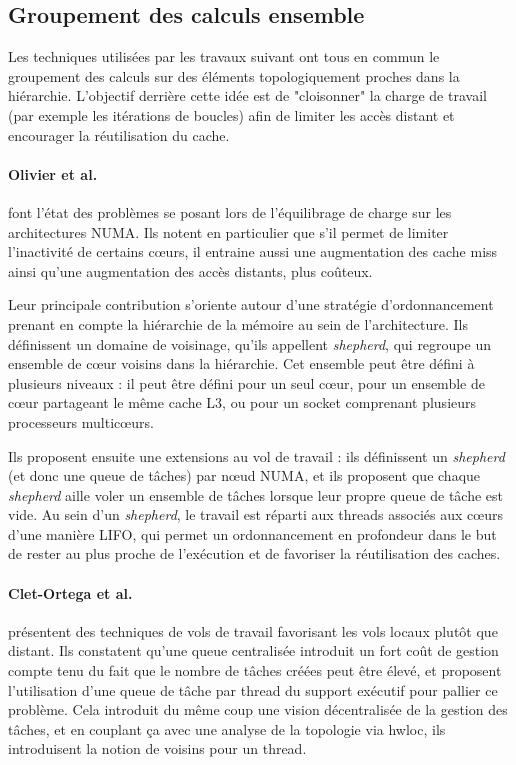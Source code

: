 \subsection{Groupement des calculs ensemble}

Les techniques utilisées par les travaux suivant ont tous en commun le groupement des calculs sur des éléments topologiquement proches dans la hiérarchie.
L'objectif derrière cette idée est de "cloisonner" la charge de travail (par exemple les itérations de boucles) afin de limiter les accès distant et encourager la réutilisation du cache.

\paragraph{Olivier et al.~\cite{Olivier2012, Olivier2013}} font l'état des problèmes se posant lors de l'équilibrage de charge sur les architectures NUMA.
Ils notent en particulier que s'il permet de limiter l'inactivité de certains cœurs, il entraine aussi une augmentation des cache miss ainsi qu'une augmentation des accès distants, plus coûteux.

Leur principale contribution s'oriente autour d'une stratégie d'ordonnancement prenant en compte la hiérarchie de la mémoire au sein de l'architecture.
Ils définissent un domaine de voisinage, qu'ils appellent \emph{shepherd}, qui regroupe un ensemble de cœur voisins dans la hiérarchie.
Cet ensemble peut être défini à plusieurs niveaux : il peut être défini pour un seul cœur, pour un ensemble de cœur partageant le même cache L3, ou pour un socket comprenant plusieurs processeurs multicœurs.

Ils proposent ensuite une extensions au vol de travail : ils définissent un \emph{shepherd} (et donc une queue de tâches) par nœud NUMA, et ils proposent que chaque \emph{shepherd} aille voler un ensemble de tâches lorsque leur propre queue de tâche est vide.
Au sein d'un \emph{shepherd}, le travail est réparti aux threads associés aux cœurs d'une manière LIFO, qui permet un ordonnancement en profondeur dans le but de rester au plus proche de l'exécution et de favoriser la réutilisation des caches.


\paragraph{Clet-Ortega et al.~\cite{Clet2014}} présentent des techniques de vols de travail favorisant les vols locaux plutôt que distant.
Ils constatent qu'une queue centralisée introduit un fort coût de gestion compte tenu du fait que le nombre de tâches créées peut être élevé, et proposent l'utilisation d'une queue de tâche par thread du support exécutif pour pallier ce problème.
Cela introduit du même coup une vision décentralisée de la gestion des tâches, et en couplant ça avec une analyse de la topologie via hwloc, ils introduisent la notion de voisins pour un thread.

